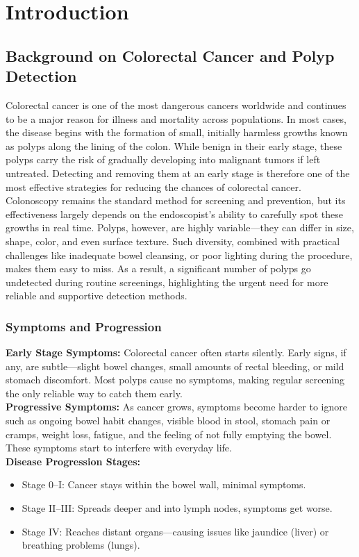 \documentclass[a4paper,12pt]{report}
\begin{document}
\tableofcontents
\newpage

\chapter{Introduction}
    \section{Background on Colorectal Cancer and Polyp Detection}
  Colorectal cancer is one of the most dangerous cancers worldwide and continues to be a major reason for illness and mortality across populations. In most cases, the disease begins with the formation of small, initially harmless growths known as polyps along the lining of the colon. While benign in their early stage, these polyps carry the risk of gradually developing into malignant tumors if left untreated. Detecting and removing them at an early stage is therefore one of the most effective strategies for reducing the chances of colorectal cancer.
Colonoscopy remains the standard method for screening and prevention, but its effectiveness largely depends on the endoscopist’s ability to carefully spot these growths in real time. Polyps, however, are highly variable—they can differ in size, shape, color, and even surface texture. Such diversity, combined with practical challenges like inadequate bowel cleansing, or poor lighting during the procedure, makes them easy to miss. As a result, a significant number of polyps go undetected during routine screenings, highlighting the urgent need for more reliable and supportive detection methods.


    \subsection{Symptoms and Progression}
    \textbf{Early Stage Symptoms:}
Colorectal cancer often starts silently. Early signs, if any, are subtle—slight bowel changes, small amounts of rectal bleeding, or mild stomach discomfort. Most polyps cause no symptoms, making regular screening the only reliable way to catch them early.\\
{}
\newline\textbf{Progressive Symptoms:}
As cancer grows, symptoms become harder to ignore such as ongoing bowel habit changes, visible blood in stool, stomach pain or cramps, weight loss, fatigue, and the feeling of not fully emptying the bowel. These symptoms start to interfere with everyday life.\\
{}
\newline\textbf{Disease Progression Stages:}
\begin{itemize}
    \item Stage 0–I: Cancer stays within the bowel wall, minimal symptoms.
    \item Stage II–III: Spreads deeper and into lymph nodes, symptoms get worse.
    \item Stage IV: Reaches distant organs—causing issues like jaundice (liver) or breathing problems (lungs).
\end{itemize}
\end{document}
